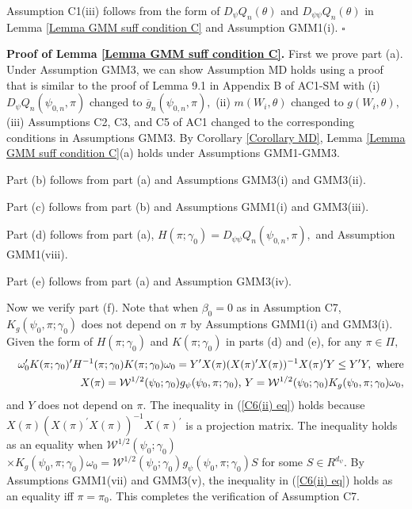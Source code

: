 \documentclass[12pt,thmsb,titlepage,final,oneside,letterpaper]{article}
\begin{document}
Assumption C1(iii) follows from the form of $D_{\psi }Q_{n}(\theta )$ and $%
D_{\psi \psi }Q_{n}(\theta )$ in Lemma \ref{Lemma GMM suff condition C} and
Assumption GMM1(i). $\square $\bigskip

\noindent \textbf{Proof of Lemma \ref{Lemma GMM suff condition C}. }First we
prove part (a). Under Assumption GMM3, we can show Assumption MD holds using
a proof that is similar to the proof of Lemma 9.1 in Appendix B of AC1-SM
with (i) $D_{\psi }Q_{n}\left( \psi _{0,n},\pi \right) $ changed to $%
\overline{g}_{n}(\psi _{0,n},\pi ),$ (ii) $m\left( W_{i},\theta \right) $
changed to $g\left( W_{i},\theta \right) ,$ (iii) Assumptions C2, C3, and C5
of AC1 changed to the corresponding conditions in Assumptions GMM3. By
Corollary \ref{Corollary MD}, Lemma \ref{Lemma GMM suff condition C}(a)
holds under Assumptions GMM1-GMM3.

Part (b) follows from part (a) and Assumptions GMM3(i) and GMM3(ii).

Part (c) follows from part (b) and Assumptions GMM1(i) and GMM3(iii).

Part (d) follows from part (a), $H(\pi ;\gamma _{0})=D_{\psi \psi
}Q_{n}(\psi _{0,n},\pi ),$ and Assumption GMM1\allowbreak (viii).

Part (e) follows from part (a) and Assumption GMM3(iv).

Now we verify part (f). Note that when $\beta _{0}=0$ as in Assumption C7, $%
K_{g}(\psi _{0},\pi ;\gamma _{0})$ does not depend on $\pi $ by Assumptions
GMM1(i) and GMM3(i). Given the form of $H(\pi ;\gamma _{0})$ and $K(\pi
;\gamma _{0})$ in parts (d) and (e), for any $\pi \in \Pi ,$%
\begin{eqnarray}
&&\omega _{0}^{\prime }K(\pi ;\gamma _{0})^{\prime }H^{-1}(\pi ;\gamma
_{0})K(\pi ;\gamma _{0})\omega _{0}\overset{}{=}Y^{\prime }X(\pi )(X(\pi
)^{\prime }X(\pi ))^{-1}X(\pi )^{\prime }Y\overset{}{\leq }Y^{\prime }Y,%
\text{ where}  \notag \\
&&X(\pi )\overset{}{=}\mathcal{W}^{1/2}(\psi _{0};\gamma _{0})g_{\psi }(\psi
_{0},\pi ;\gamma _{0})\text{, }Y\overset{}{=}\mathcal{W}^{1/2}(\psi
_{0};\gamma _{0})K_{g}(\psi _{0},\pi ;\gamma _{0})\omega _{0},
\label{C6(ii) eq}
\end{eqnarray}%
and $Y$ does not depend on $\pi .$ The inequality in (\ref{C6(ii) eq}) holds
because $X(\pi )(X(\pi )^{\prime }X(\pi ))^{-1}\allowbreak X(\pi )^{\prime }$
is a projection matrix. The inequality holds as an equality when $\mathcal{W}%
^{1/2}(\psi _{0};\gamma _{0})$\linebreak $\times K_{g}(\psi _{0},\pi ;\gamma
_{0})\omega _{0}=\mathcal{W}^{1/2}(\psi _{0};\gamma _{0})g_{\psi }(\psi
_{0},\pi ;\gamma _{0})S$ for some $S\in R^{d_{\psi }}.$ By Assumptions
GMM1(vii) and GMM3(v), the inequality in (\ref{C6(ii) eq}) holds as an
equality iff $\pi =\pi _{0}.$ This completes the verification of Assumption
C7.
\end{document}
